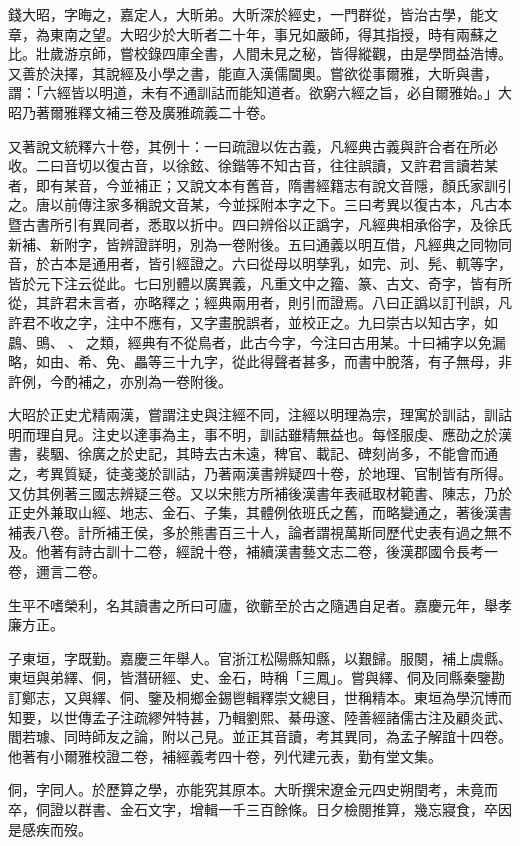 \begin{pinyinscope}
錢大昭，字晦之，嘉定人，大昕弟。大昕深於經史，一門群從，皆治古學，能文章，為東南之望。大昭少於大昕者二十年，事兄如嚴師，得其指授，時有兩蘇之比。壯歲游京師，嘗校錄四庫全書，人間未見之秘，皆得縱觀，由是學問益浩博。又善於決擇，其說經及小學之書，能直入漢儒閫奧。嘗欲從事爾雅，大昕與書，謂：「六經皆以明道，未有不通訓詁而能知道者。欲窮六經之旨，必自爾雅始。」大昭乃著爾雅釋文補三卷及廣雅疏義二十卷。

又著說文統釋六十卷，其例十：一曰疏證以佐古義，凡經典古義與許合者在所必收。二曰音切以復古音，以徐鉉、徐鍇等不知古音，往往誤讀，又許君言讀若某者，即有某音，今並補正；又說文本有舊音，隋書經籍志有說文音隱，顏氏家訓引之。唐以前傳注家多稱說文音某，今並採附本字之下。三曰考異以復古本，凡古本暨古書所引有異同者，悉取以折中。四曰辨俗以正譌字，凡經典相承俗字，及徐氏新補、新附字，皆辨證詳明，別為一卷附後。五曰通義以明互借，凡經典之同物同音，於古本是通用者，皆引經證之。六曰從母以明孳乳，如完、刓、髡、軏等字，皆於元下注云從此。七曰別體以廣異義，凡重文中之籀、篆、古文、奇字，皆有所從，其許君未言者，亦略釋之；經典兩用者，則引而證焉。八曰正譌以訂刊誤，凡許君不收之字，注中不應有，又字畫脫誤者，並校正之。九曰崇古以知古字，如鷐、鴠、、之類，經典有不從鳥者，此古今字，今注曰古用某。十曰補字以免漏略，如由、希、免、畾等三十九字，從此得聲者甚多，而書中脫落，有子無母，非許例，今酌補之，亦別為一卷附後。

大昭於正史尤精兩漢，嘗謂注史與注經不同，注經以明理為宗，理寓於訓詁，訓詁明而理自見。注史以達事為主，事不明，訓詁雖精無益也。每怪服虔、應劭之於漢書，裴駰、徐廣之於史記，其時去古未遠，稗官、載記、碑刻尚多，不能會而通之，考異質疑，徒戔戔於訓詁，乃著兩漢書辨疑四十卷，於地理、官制皆有所得。又仿其例著三國志辨疑三卷。又以宋熊方所補後漢書年表祗取材範書、陳志，乃於正史外兼取山經、地志、金石、子集，其體例依班氏之舊，而略變通之，著後漢書補表八卷。計所補王侯，多於熊書百三十人，論者謂視萬斯同歷代史表有過之無不及。他著有詩古訓十二卷，經說十卷，補續漢書藝文志二卷，後漢郡國令長考一卷，邇言二卷。

生平不嗜榮利，名其讀書之所曰可廬，欲蘄至於古之隨遇自足者。嘉慶元年，舉孝廉方正。

子東垣，字既勤。嘉慶三年舉人。官浙江松陽縣知縣，以艱歸。服闋，補上虞縣。東垣與弟繹、侗，皆潛研經、史、金石，時稱「三鳳」。嘗與繹、侗及同縣秦鑒勘訂鄭志，又與繹、侗、鑒及桐鄉金錫鬯輯釋崇文總目，世稱精本。東垣為學沉博而知要，以世傳孟子注疏繆舛特甚，乃輯劉熙、綦毋邃、陸善經諸儒古注及顧炎武、閻若璩、同時師友之論，附以己見。並正其音讀，考其異同，為孟子解誼十四卷。他著有小爾雅校證二卷，補經義考四十卷，列代建元表，勤有堂文集。

侗，字同人。於歷算之學，亦能究其原本。大昕撰宋遼金元四史朔閏考，未竟而卒，侗證以群書、金石文字，增輯一千三百餘條。日夕檢閱推算，幾忘寢食，卒因是感疾而歿。


\end{pinyinscope}

